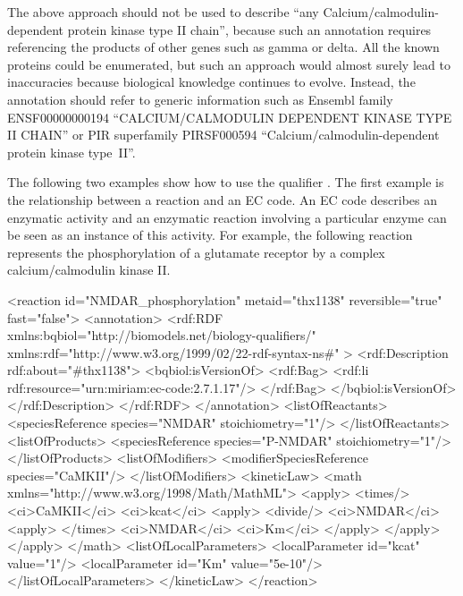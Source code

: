 The above approach should not be used to describe ``any
Calcium/calmodulin-dependent protein kinase type II chain'',
because such an annotation requires referencing the products of
other genes such as gamma or delta. All the known proteins could
be enumerated, but such an approach would almost surely lead to
inaccuracies because biological knowledge continues to evolve.
Instead, the annotation should refer to generic information such
as Ensembl family ENSF00000000194 ``CALCIUM/CALMODULIN DEPENDENT
KINASE TYPE II CHAIN'' or PIR superfamily PIRSF000594
``Calcium/calmodulin-dependent protein kinase type~II''.


The following two examples show how to use the qualifier
. The first example is the relationship
between a reaction and an EC code. An EC code describes an
enzymatic activity and an enzymatic reaction involving a
particular enzyme can be seen as an instance of this activity. For
example, the following reaction represents the phosphorylation of
a glutamate receptor by a complex calcium/calmodulin kinase II.

\begin{example}
<reaction id="NMDAR_phosphorylation" metaid="thx1138"
          reversible="true" fast="false">
  <annotation>
    <rdf:RDF
      xmlns:bqbiol="http://biomodels.net/biology-qualifiers/"
      xmlns:rdf="http://www.w3.org/1999/02/22-rdf-syntax-ns\#"
    >
      <rdf:Description rdf:about="#thx1138">
        <bqbiol:isVersionOf>
          <rdf:Bag>
            <rdf:li rdf:resource="urn:miriam:ec-code:2.7.1.17"/>
          </rdf:Bag>
        </bqbiol:isVersionOf>
      </rdf:Description>
    </rdf:RDF>
  </annotation>
  <listOfReactants>
    <speciesReference species="NMDAR" stoichiometry="1"/>
  </listOfReactants>
  <listOfProducts>
    <speciesReference species="P-NMDAR" stoichiometry="1"/>
  </listOfProducts>
  <listOfModifiers>
    <modifierSpeciesReference species="CaMKII"/>
  </listOfModifiers>
  <kineticLaw>
    <math xmlns="http://www.w3.org/1998/Math/MathML">
      <apply>
        <times/>
        <ci>CaMKII</ci>
        <ci>kcat</ci>
        <apply>
          <divide/>
          <ci>NMDAR</ci>
          <apply> </times> <ci>NMDAR</ci> <ci>Km</ci> </apply>
        </apply>
      </apply>
    </math>
    <listOfLocalParameters>
      <localParameter id="kcat" value="1"/>
      <localParameter id="Km" value="5e-10"/>
    </listOfLocalParameters>
  </kineticLaw>
</reaction>
\end{example}


